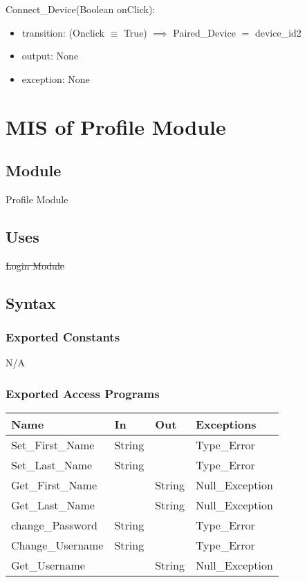 \documentclass[12pt, titlepage]{article}
\begin{document}
\noindent Connect\_Device(Boolean onClick):
\begin{itemize}
\item transition: (Onclick $\equiv$ True) $\implies$ Paired\_Device $=$ device\_id2 
\item output: None
\item exception: None
\end{itemize}

\newpage



\section{MIS of Profile Module} \label{profile Module}
\subsection{Module}
Profile Module
\subsection{Uses}
\sout{Login Module}
\subsection{Syntax}

\subsubsection{Exported Constants}
N/A

\subsubsection{Exported Access Programs}

\begin{center}
\begin{tabular}{p{4cm} p{4cm} p{4cm} p{4cm}}
\hline
\textbf{Name} & \textbf{In} & \textbf{Out} & \textbf{Exceptions} \\
\hline
Set\_First\_Name & String &  & Type\_Error \\
\hline
Set\_Last\_Name & String &  &  Type\_Error\\
\hline
Get\_First\_Name &  & String & Null\_Exception \\
\hline
Get\_Last\_Name &  & String & Null\_Exception \\
\hline
change\_Password & String &  & Type\_Error \\
\hline
Change\_Username & String &  &  Type\_Error\\
\hline
Get\_Username &  & String & Null\_Exception\\
\hline
\end{tabular}
\end{center}
\end{document}
